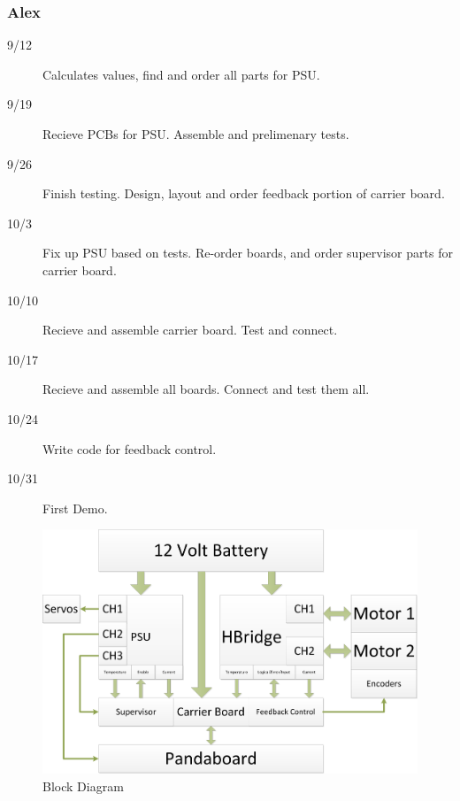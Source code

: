 \documentclass[12pt]{article}
\begin{document}
 \subsubsection{Alex}
 \begin{description}
  \item[9/12] Calculates values, find and order all parts for PSU.
  \item[9/19] Recieve PCBs for PSU. Assemble and prelimenary tests.
  \item[9/26] Finish testing.  Design, layout and order feedback portion of carrier board.
  \item[10/3] Fix up PSU based on tests. Re-order boards, and order supervisor parts for carrier board.
  \item[10/10] Recieve and assemble carrier board. Test and connect.
  \item[10/17] Recieve and assemble all boards. Connect and test them all.
  \item[10/24] Write code for feedback control.
  \item[10/31] First Demo.
\end{description}
\begin{figure}[htb]
\centering
\includegraphics[width=6in]{Block_Diagram.png}
\caption{Block Diagram}
\end{figure}

 
\end{document}
